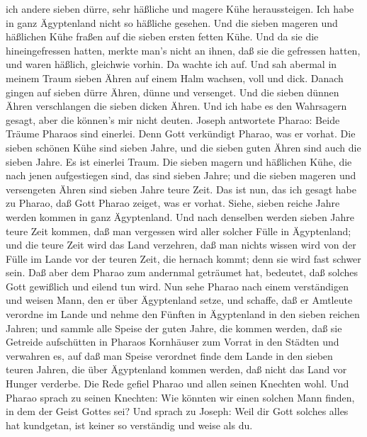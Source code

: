 ich andere sieben dürre, sehr häßliche und magere Kühe heraussteigen.
Ich habe in ganz Ägyptenland nicht so häßliche gesehen. 
Und die sieben mageren und häßlichen Kühe fraßen auf die sieben ersten
fetten Kühe.  Und da sie die hineingefressen hatten, merkte
man's nicht an ihnen, daß sie die gefressen hatten, und waren häßlich,
gleichwie vorhin. Da wachte ich auf.  Und sah abermal in
meinem Traum sieben Ähren auf einem Halm wachsen, voll und dick.
 Danach gingen auf sieben dürre Ähren, dünne und versenget.
 Und die sieben dünnen Ähren verschlangen die sieben dicken
Ähren. Und ich habe es den Wahrsagern gesagt, aber die können's mir
nicht deuten.  Joseph antwortete Pharao: Beide Träume
Pharaos sind einerlei. Denn Gott verkündigt Pharao, was er vorhat.
 Die sieben schönen Kühe sind sieben Jahre, und die sieben
guten Ähren sind auch die sieben Jahre. Es ist einerlei Traum.
 Die sieben magern und häßlichen Kühe, die nach jenen
aufgestiegen sind, das sind sieben Jahre; und die sieben mageren und
versengeten Ähren sind sieben Jahre teure Zeit.  Das ist
nun, das ich gesagt habe zu Pharao, daß Gott Pharao zeiget, was er
vorhat.  Siehe, sieben reiche Jahre werden kommen in ganz
Ägyptenland.  Und nach denselben werden sieben Jahre teure
Zeit kommen, daß man vergessen wird aller solcher Fülle in Ägyptenland;
und die teure Zeit wird das Land verzehren,  daß man nichts
wissen wird von der Fülle im Lande vor der teuren Zeit, die hernach
kommt; denn sie wird fast schwer sein.  Daß aber dem Pharao
zum andernmal geträumet hat, bedeutet, daß solches Gott gewißlich und
eilend tun wird.  Nun sehe Pharao nach einem verständigen
und weisen Mann, den er über Ägyptenland setze,  und
schaffe, daß er Amtleute verordne im Lande und nehme den Fünften in
Ägyptenland in den sieben reichen Jahren;  und sammle alle
Speise der guten Jahre, die kommen werden, daß sie Getreide aufschütten
in Pharaos Kornhäuser zum Vorrat in den Städten und verwahren es,
 auf daß man Speise verordnet finde dem Lande in den sieben
teuren Jahren, die über Ägyptenland kommen werden, daß nicht das Land
vor Hunger verderbe.  Die Rede gefiel Pharao und allen
seinen Knechten wohl.  Und Pharao sprach zu seinen
Knechten: Wie könnten wir einen solchen Mann finden, in dem der Geist
Gottes sei?  Und sprach zu Joseph: Weil dir Gott solches
alles hat kundgetan, ist keiner so verständig und weise als du.
